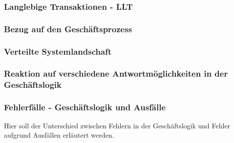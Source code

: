 \subsubsection{Langlebige Transaktionen - LLT}
\subsubsection{Bezug auf den Geschäftsprozess}
\subsubsection{Verteilte Systemlandschaft}
\subsubsection{Reaktion auf verschiedene Antwortmöglichkeiten in der Geschäftslogik}
\subsubsection{Fehlerfälle - Geschäftslogik und Ausfälle}
Hier soll der Unterschied zwischen Fehlern in der Geschäftslogik und Fehler aufgrund Ausfällen erläutert werden.

